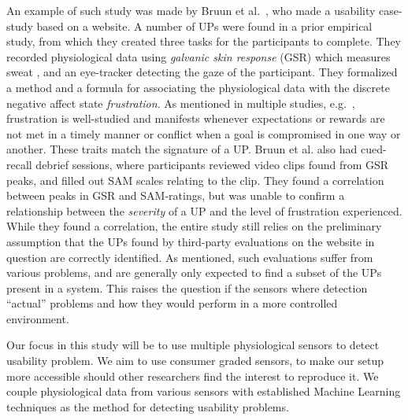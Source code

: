 An example of such study was made by Bruun et al.~\cite{LH-paper}, who made a usability case-study based on a website.
A number of UPs were found in a prior empirical study, from which they created three tasks for the participants to complete.
They recorded physiological data using \textit{galvanic skin response} (GSR) which measures sweat \cite{gsr_calibration}, and an eye-tracker detecting the gaze of the participant.
They formalized a method and a formula for associating the physiological data with the discrete negative affect state \textit{frustration}.
As mentioned in multiple studies, e.g.~\cite{LH-paper,frustration_with_computers}, frustration is well-studied
and manifests whenever expectations or rewards are not met in a timely manner or conflict when a goal is compromised in one way or another.
These traits match the signature of a UP.
Bruun et al. also had cued-recall debrief sessions, where participants reviewed video clips found from GSR peaks, and filled out SAM scales relating to the clip. 
They found a correlation between peaks in GSR and SAM-ratings, but was unable to confirm a relationship between the
\textit{severity} of a UP and the level of frustration experienced.
While they found a correlation, the entire study still relies on the preliminary assumption that the UPs found by
third-party evaluations on the website in question are correctly identified.
As mentioned, such evaluations suffer from various problems, and are generally only expected to find a subset of the UPs present in a system. 
This raises the question if the sensors where detection ``actual'' problems and how they would perform in a more controlled environment.

Our focus in this study will be to use multiple physiological sensors to detect usability problem. We aim to use
consumer graded sensors, to make our setup more accessible should other researchers find the interest to reproduce
it. We couple physiological data from various sensors with established Machine Learning techniques as the method for
detecting usability problems.